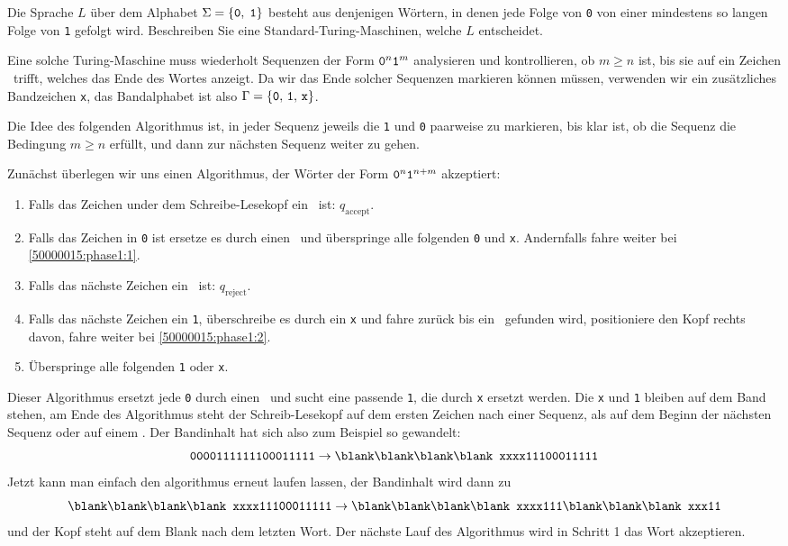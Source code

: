 Die Sprache $L$ über dem Alphabet $\Sigma = \{{\tt 0},\;{\tt 1}\}$
besteht aus denjenigen Wörtern, in denen jede Folge von {\tt 0}
von einer mindestens so langen Folge von {\tt 1} gefolgt wird.
Beschreiben Sie eine Standard-Turing-Maschinen, welche $L$
entscheidet.


\begin{loesung}
Eine solche Turing-Maschine muss wiederholt Sequenzen der
Form ${\tt 0}^n{\tt 1}^m$ analysieren und kontrollieren, ob $m \ge n$ ist,
bis sie auf ein Zeichen \blank\ trifft, welches das Ende des
Wortes anzeigt. Da wir das Ende solcher Sequenzen markieren 
können müssen, verwenden wir ein zusätzliches Bandzeichen
{\tt x}, das Bandalphabet ist also $\Gamma
=\{{\tt 0},\,{\tt 1},\,{\tt x}\}$.

Die Idee des folgenden Algorithmus ist, in jeder Sequenz jeweils
die {\tt 1} und {\tt 0} paarweise zu markieren, bis klar ist,
ob die Sequenz die Bedingung $m\ge n$ erfüllt, und dann zur
nächsten Sequenz weiter zu gehen.

Zunächst überlegen wir uns einen Algorithmus, der Wörter der Form
${\tt 0}^n{\tt 1}^{n+m}$ akzeptiert:
\begin{enumerate}
\item Falls das Zeichen under dem Schreibe-Lesekopf ein \blank\ ist:
$q_\text{accept}$.
\item
\label{50000015:phase1:2}
Falls das Zeichen in {\tt 0} ist ersetze es durch einen \blank\ und
überspringe alle folgenden {\tt 0} und {\tt x}.
Andernfalls fahre weiter bei \ref{50000015:phase1:1}.
\item
Falls das nächste Zeichen ein \blank\ ist: $q_\text{reject}$.
\item
Falls das nächste Zeichen ein {\tt 1}, überschreibe es durch ein {\tt x}
und fahre zurück bis ein \blank\ gefunden wird, positioniere den Kopf
rechts davon, fahre weiter bei \ref{50000015:phase1:2}.
\item
\label{50000015:phase1:1}
Überspringe alle folgenden {\tt 1} oder {\tt x}.
\end{enumerate}
Dieser Algorithmus ersetzt jede {\tt 0} durch einen \blank\ und sucht eine
passende {\tt 1}, die durch {\tt x} ersetzt werden.
Die {\tt x} und {\tt 1} bleiben auf dem Band stehen, am Ende des Algorithmus
steht der Schreib-Lesekopf auf dem ersten Zeichen nach einer Sequenz,
als auf dem Beginn der nächsten Sequenz oder auf einem \blank.
Der Bandinhalt hat sich also zum Beispiel so gewandelt:
\[
\text {\tt 0000111111100011111}
\rightarrow
\text {\tt \blank\blank\blank\blank xxxx11100011111}
\]
Jetzt kann man einfach den algorithmus erneut laufen lassen, der Bandinhalt
wird dann zu
\[
\text {\tt \blank\blank\blank\blank xxxx11100011111}
\rightarrow
\text {\tt \blank\blank\blank\blank xxxx111\blank\blank\blank xxx11}
\]
und der Kopf steht auf dem Blank nach dem letzten Wort.
Der nächste Lauf des Algorithmus wird in Schritt 1 das Wort akzeptieren.


\end{loesung}
